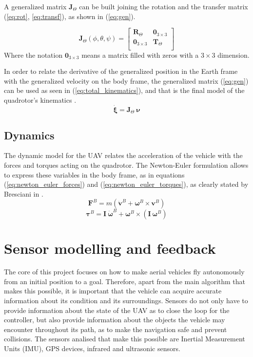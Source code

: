 \documentclass[journal]{IEEEtran}
\begin{document}
	A generalized matrix $\bm{J}_\Theta$ can be built joining the rotation and the transfer matrix (\ref{eq:rot}, \ref{eq:transf}), as shown in (\ref{eq:gen}).
	
	\begin{equation} \label{eq:gen}
	\bm{J}_\Theta (\phi,\theta, \psi)= \left[ {\begin{array}{cc}
		\bm{R}_\Theta &  \mathbf{0}_{3\times 3} \\
		\mathbf{0}_{3\times 3} & \bm{T}_\Theta \\
		\end{array} } \right]
	\end{equation}  
	Where the notation $\mathbf{0}_{3\times 3}$ means a matrix filled with zeros with a $3 \times 3$ dimension.
	
	In order to relate the derivative of the generalized position in the Earth frame with the generalized velocity on the body frame, the generalized matrix (\ref{eq:gen}) can be used as seen in (\ref{eq:total_kinematics}), and that is the final model of the quadrotor's kinematics \cite{SabatinoFrancesco2015Qcmn, mod_control_bresciani}.
	\begin{equation} \label{eq:total_kinematics}
	\bm{\dot\xi} = \bm{J}_\Theta \ 	\bm{\nu} 
	\end{equation} 
	
	\subsection{Dynamics}
	The dynamic model for the UAV relates the acceleration of the vehicle with the forces and torques acting on the quadrotor. The Newton-Euler formulation allows to express these variables in the body frame, as in equations (\ref{eq:newton_euler_forces}) and (\ref{eq:newton_euler_torques}), as clearly stated by Bresciani in \cite{mod_control_bresciani}.
	\begin{equation} \label{eq:newton_euler_forces}
	\bm{F}^B = m ( \bm{\dot v}^B + \bm{\omega}^B \times \bm{v}^B)
	\end{equation}
	\begin{equation} \label{eq:newton_euler_torques}
	\bm{\tau}^B = \bm{I} \ \bm{\dot \omega}^B + \bm{\omega}^B \times (\bm{I} \ \bm{\omega}^B)
	\end{equation}
	
	\section{Sensor modelling and feedback}
	The core of this project focuses on how to make aerial vehicles fly autonomously from an initial position to a goal. Therefore, apart from the main algorithm that makes this possible, it is important that the vehicle can acquire accurate information about its condition and its surroundings. Sensors do not only have to provide information about the state of the UAV as to close the loop for the controller, but also provide information about the objects the vehicle may encounter throughout its path, as to make the navigation safe and prevent collisions. The sensors analised that make this possible are Inertial Measurement Units (IMU), GPS devices, infrared and ultrasonic sensors.\\
	
\end{document}
